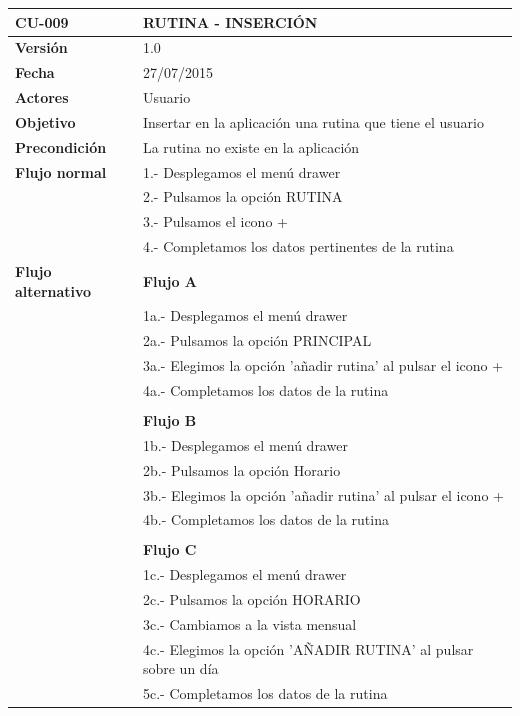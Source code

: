 \documentclass[../pfc.tex]{subfiles}
\begin{document}
		\begin{table}[H]
			\centering
			\begin{tabular}[t]{|p{3cm}|p{9.5cm}|}
				\hline \textbf{CU-009} & \textbf{RUTINA - INSERCIÓN} \\*
				\hline\hline \textbf{Versión} & 1.0 \\*
				\hline\hline \textbf{Fecha} & 27/07/2015 \\*
				\hline\textbf{Actores} 	& Usuario\\*
				\hline \textbf{Objetivo} & Insertar en la aplicación una rutina que tiene el usuario\\* 			
				\hline \textbf{Precondición} & La rutina no existe en la aplicación\\* 
				\hline \textbf{Flujo normal} & 1.- Desplegamos el menú drawer \\* 
				& 2.- Pulsamos la opción RUTINA\\*	
				& 3.- Pulsamos el icono +\\*	
				& 4.- Completamos los datos pertinentes de la rutina\\*	
				\hline \textbf{Flujo alternativo} & \textbf{Flujo A} \\* 
				& 1a.- Desplegamos el menú drawer \\* 
				& 2a.- Pulsamos la opción PRINCIPAL \\*
				& 3a.- Elegimos la opción 'añadir rutina' al pulsar el icono +\\*	
				& 4a.- Completamos los datos de la rutina\\*	
				& \\*	
				& \textbf{Flujo B} \\* 
				& 1b.- Desplegamos el menú drawer \\* 
				& 2b.- Pulsamos la opción Horario \\*	
				& 3b.- Elegimos la opción 'añadir rutina' al pulsar el icono +\\*	
				& 4b.- Completamos los datos de la rutina\\*	
				& \\*	
				& \textbf{Flujo C} \\* 
				& 1c.- Desplegamos el menú drawer \\* 
				& 2c.- Pulsamos la opción HORARIO \\*	
				& 3c.- Cambiamos a la vista mensual \\*	
				& 4c.- Elegimos la opción 'AÑADIR RUTINA' al pulsar sobre un día\\*	
				& 5c.- Completamos los datos de la rutina\\*	

\end{tabular}
\end{table}
\end{document}
